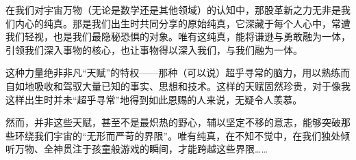 在我们对宇宙万物（无论是数学还是其他领域）的认知中，那股革新之力无非是我们内心的纯真。那是我们出生时共同分享的原始纯真，它深藏于每个人心中，常遭我们轻视，也是我们最隐秘恐惧的对象。唯有这纯真，能将谦逊与勇敢融为一体，引领我们深入事物的核心，也让事物得以深入我们，与我们融为一体。

这种力量绝非非凡“天赋”的特权——那种（可以说）超乎寻常的脑力，用以熟练而自如地吸收和驾驭大量已知的事实、思想和技术。这样的天赋固然珍贵，对于像我这样出生时并未“超乎寻常”地得到如此恩赐的人来说，无疑令人羡慕。

然而，并非这些天赋，甚至不是最炽热的野心，辅以坚定不移的意志，能够突破那些环绕我们宇宙的“无形而严苛的界限”。唯有纯真，在不知不觉中，在我们独处倾听万物、全神贯注于孩童般游戏的瞬间，才能跨越这些界限……